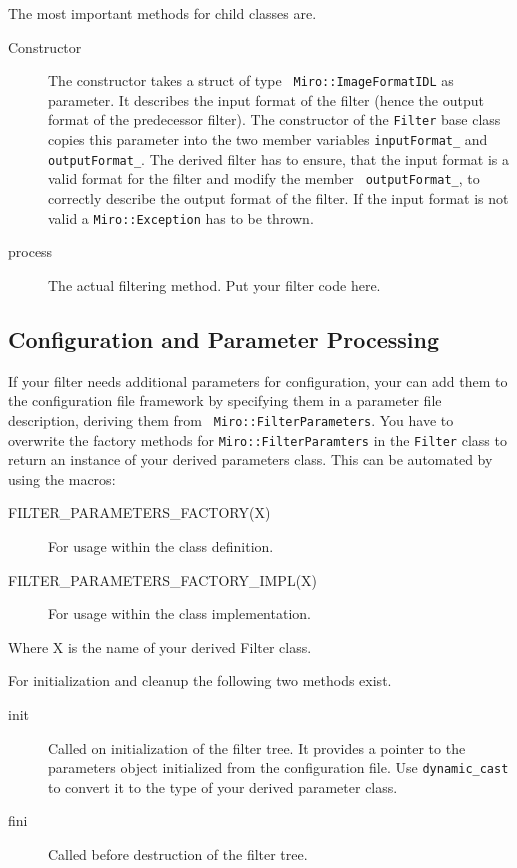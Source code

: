 The most important methods for child classes are.
\begin{description}
\item[Constructor] The constructor takes a struct of type {\tt
    Miro::ImageFormatIDL} as parameter. It describes the input format
  of the filter (hence the output format of the predecessor filter).
  The constructor of the {\tt Filter} base class copies this parameter
  into the two member variables {\tt inputFormat\_} and {\tt
    outputFormat\_}. The derived filter has to ensure, that the input
  format is a valid format for the filter and modify the member {\tt
    outputFormat\_}, to correctly describe the output format of the
  filter. If the input format is not valid a {\tt Miro::Exception} has
  to be thrown.
\item[process] The actual filtering method. Put your filter code here.
\end{description}

\subsection{Configuration and Parameter Processing}

If your filter needs additional parameters for configuration, your can
add them to the configuration file framework by specifying them in a
parameter file description, deriving them from {\tt
  Miro::FilterParameters}. You have to overwrite the factory methods
for {\tt Miro::FilterParamters} in the {\tt Filter} class to return an
instance of your derived parameters class. This can be automated by
using the macros:
\begin{description}
\item[FILTER\_PARAMETERS\_FACTORY(X)] For usage within the class definition.
\item[FILTER\_PARAMETERS\_FACTORY\_IMPL(X)] For usage within the class implementation.
\end{description}
Where X is the name of your derived Filter class. 

For initialization and cleanup the following two methods exist.
\begin{description}
\item[init] Called on initialization of the filter tree. It provides a
  pointer to the parameters object initialized from the configuration
  file. Use {\tt dynamic\_cast} to convert it to the type of your
  derived parameter class.
\item[fini] Called before destruction of the filter tree.
\end{description}

